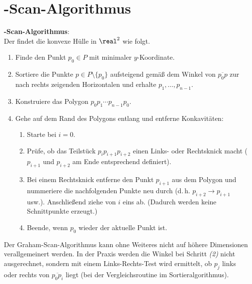 \section{%
    -Scan-Algorithmus%
}

\textbf{-Scan-Algorithmus}:\\
Der  findet die konvexe Hülle in $\real^2$ wie folgt.
\begin{enumerate}
    \item
    Finde den Punkt $p_0 \in P$ mit minimaler $y$-Koordinate.

    \item
    Sortiere die Punkte $p \in P \setminus \{p_0\}$ aufsteigend gemäß dem Winkel
    von $\overline{p_0 p}$ zur nach rechts zeigenden Horizontalen und erhalte
    $p_1, \dotsc, p_{n-1}$.

    \item
    Konstruiere das Polygon $p_0 p_1 \dotsb p_{n-1} p_0$.

    \item
    Gehe auf dem Rand des Polygons entlang und entferne Konkavitäten:
    \begin{enumerate}[label=\emph{(\roman*)}]
        \item
        Starte bei $i = 0$.

        \item
        Prüfe, ob das Teilstück $p_i p_{i+1} p_{i+2}$ einen Links- oder Rechtsknick macht
        ($p_{i+1}$ und $p_{i+2}$ am Ende entsprechend definiert).

        \item
        Bei einem Rechtsknick entferne den Punkt $p_{i+1}$ aus dem Polygon und
        nummeriere die nachfolgenden Punkte neu durch (d.\,h. $p_{i+2} \rightarrow p_{i+1}$ usw.).
        Anschließend ziehe von $i$ eins ab.
        (Dadurch werden keine Schnittpunkte erzeugt.)

        \item
        Beende, wenn $p_0$ wieder der aktuelle Punkt ist.
    \end{enumerate}
\end{enumerate}
Der Graham-Scan-Algorithmus kann ohne Weiteres nicht auf höhere Dimensionen verallgemeinert werden.
In der Praxis werden die Winkel bei Schritt \emph{(2)} nicht ausgerechnet, sondern
mit einem Links-Rechts-Test wird ermittelt, ob $p_j$ links oder rechts von $\overline{p_0 p_i}$
liegt (bei der Vergleichsroutine im Sortieralgorithmus).

